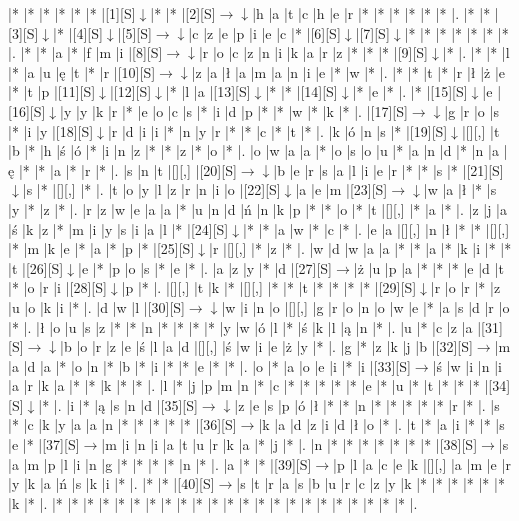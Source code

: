 \documentclass[11pt]{article}
\newcommand\drarr{$\rightarrow \!\!\!\!\! \downarrow$}
\newcommand\rarr{$\rightarrow$}
\newcommand\darr{$\downarrow$}
\begin{document}
\noindent\begin{Puzzle}{22}{29}|*	|*	|*	|*	|*	|*	|[1][S]\darr	|*	|*	|[2][S]\drarr	|h	|a	|t	|c	|h	|e	|r	|*	|*	|*	|*	|*	|*	|.
|*	|*	|[3][S]\darr	|*	|[4][S]\darr	|[5][S]\drarr	|c	|z	|e	|p	|i	|e	|c	|*	|[6][S]\darr	|[7][S]\darr	|*	|*	|*	|*	|*	|*	|*	|.
|*	|*	|a	|*	|f	|m	|i	|[8][S]\drarr	|r	|o	|c	|z	|n	|i	|k	|a	|r	|z	|*	|*	|*	|[9][S]\darr	|*	|.
|*	|*	|l	|*	|a	|u	|ę	|t	|*	|r	|[10][S]\drarr	|z	|a	|ł	|a	|m	|a	|n	|i	|e	|*	|w	|*	|.
|*	|*	|t	|*	|r	|ł	|ż	|e	|*	|t	|p	|[11][S]\darr	|[12][S]\darr	|*	|l	|a	|[13][S]\darr	|*	|*	|[14][S]\darr	|*	|e	|*	|.
|*	|[15][S]\darr	|e	|[16][S]\darr	|y	|y	|k	|r	|*	|e	|o	|c	|s	|*	|i	|d	|p	|*	|*	|w	|*	|k	|*	|.
|[17][S]\drarr	|g	|r	|o	|s	|*	|i	|y	|[18][S]\darr	|r	|d	|i	|i	|*	|n	|y	|r	|*	|*	|c	|*	|t	|*	|.
|k	|ó	|n	|s	|*	|[19][S]\darr	|[][,]{ }	|t	|b	|*	|h	|ś	|ó	|*	|i	|n	|z	|*	|*	|z	|*	|o	|*	|.
|o	|w	|a	|a	|*	|o	|s	|o	|u	|*	|a	|n	|d	|*	|n	|a	|ę	|*	|*	|a	|*	|r	|*	|.
|s	|n	|t	|[][,]{ }	|[20][S]\drarr	|b	|e	|r	|s	|a	|l	|i	|e	|r	|*	|*	|s	|*	|[21][S]\darr	|s	|*	|[][,]{ }	|*	|.
|t	|o	|y	|l	|z	|r	|n	|i	|o	|[22][S]\darr	|a	|e	|m	|[23][S]\drarr	|w	|a	|ł	|*	|s	|y	|*	|z	|*	|.
|r	|z	|w	|e	|a	|a	|*	|u	|n	|d	|ń	|n	|k	|p	|*	|*	|o	|*	|t	|[][,]{ }	|*	|a	|*	|.
|z	|j	|a	|ś	|k	|z	|*	|m	|i	|y	|s	|i	|a	|l	|*	|[24][S]\darr	|*	|*	|a	|w	|*	|c	|*	|.
|e	|a	|[][,]{ }	|n	|ł	|*	|*	|[][,]{ }	|*	|m	|k	|e	|*	|a	|*	|p	|*	|[25][S]\darr	|r	|[][,]{ }	|*	|z	|*	|.
|w	|d	|w	|a	|a	|*	|*	|a	|*	|k	|i	|*	|*	|t	|[26][S]\darr	|e	|*	|p	|o	|s	|*	|e	|*	|.
|a	|z	|y	|*	|d	|[27][S]\rarr	|ż	|u	|p	|a	|*	|*	|*	|e	|d	|t	|*	|o	|r	|i	|[28][S]\darr	|p	|*	|.
|[][,]{ }	|t	|k	|*	|[][,]{ }	|*	|*	|t	|*	|*	|*	|*	|[29][S]\darr	|r	|o	|r	|*	|z	|u	|o	|k	|i	|*	|.
|d	|w	|l	|[30][S]\drarr	|w	|i	|n	|o	|[][,]{ }	|g	|r	|o	|n	|o	|w	|e	|*	|a	|s	|d	|r	|o	|*	|.
|ł	|o	|u	|s	|z	|*	|*	|n	|*	|*	|*	|*	|y	|w	|ó	|l	|*	|ś	|k	|l	|ą	|n	|*	|.
|u	|*	|c	|z	|a	|[31][S]\drarr	|b	|o	|r	|z	|e	|ś	|l	|a	|d	|[][,]{ }	|ś	|w	|i	|e	|ż	|y	|*	|.
|g	|*	|z	|k	|j	|b	|[32][S]\rarr	|m	|a	|d	|a	|*	|o	|n	|*	|b	|*	|i	|*	|*	|e	|*	|*	|.
|o	|*	|a	|o	|e	|i	|*	|i	|[33][S]\rarr	|ś	|w	|i	|n	|i	|a	|r	|k	|a	|*	|*	|k	|*	|*	|.
|l	|*	|j	|p	|m	|n	|*	|c	|*	|*	|*	|*	|*	|e	|*	|u	|*	|t	|*	|*	|*	|[34][S]\darr	|*	|.
|i	|*	|ą	|s	|n	|d	|[35][S]\drarr	|z	|e	|s	|p	|ó	|ł	|*	|*	|n	|*	|*	|*	|*	|*	|r	|*	|.
|s	|*	|c	|k	|y	|a	|a	|n	|*	|*	|*	|*	|*	|[36][S]\rarr	|k	|a	|d	|z	|i	|d	|ł	|o	|*	|.
|t	|*	|a	|i	|*	|*	|s	|e	|*	|[37][S]\rarr	|m	|i	|n	|i	|a	|t	|u	|r	|k	|a	|*	|j	|*	|.
|n	|*	|*	|*	|*	|*	|*	|*	|[38][S]\rarr	|s	|a	|m	|p	|l	|i	|n	|g	|*	|*	|*	|*	|n	|*	|.
|a	|*	|*	|[39][S]\rarr	|p	|l	|a	|c	|e	|k	|[][,]{ }	|a	|m	|e	|r	|y	|k	|a	|ń	|s	|k	|i	|*	|.
|*	|*	|[40][S]\rarr	|s	|t	|r	|a	|s	|b	|u	|r	|c	|z	|y	|k	|*	|*	|*	|*	|*	|*	|k	|*	|.
|*	|*	|*	|*	|*	|*	|*	|*	|*	|*	|*	|*	|*	|*	|*	|*	|*	|*	|*	|*	|*	|*	|*	|.\end{Puzzle}
\end{document}
